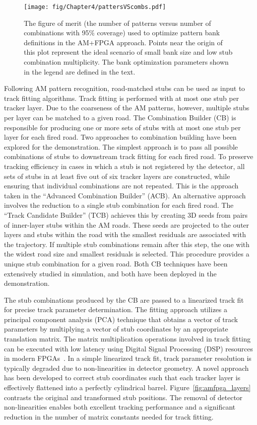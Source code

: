 \begin{figure}[t]
  \centering
  \texttt{[image: fig/Chapter4/pattersVScombs.pdf]}
  \caption{The figure of merit (the number of patterns versus number of combinations with 95\% coverage) used to optimize pattern bank definitions in the AM+FPGA approach. Points near the origin of this plot represent the ideal scenario of small bank size and low stub combination multiplicity. The bank optimization parameters shown in the legend are defined in the text.} 
  \label{fig:amfpga_bankopt}
\end{figure}

Following AM pattern recognition, road-matched stubs can be used as input to track fitting algorithms. Track fitting is performed with at most one stub per tracker layer. Due to the coarseness of the AM patterns, however, multiple stubs per layer can be matched to a given road. The Combination Builder (CB) is responsible for producing one or more sets of stubs with at most one stub per layer for each fired road. Two approaches to combination building have been explored for the demonstration. The simplest approach is to pass all possible combinations of stubs to downstream track fitting for each fired road. To preserve tracking efficiency in cases in which a stub is not registered by the detector, all sets of stubs in at least five out of six tracker layers are constructed, while ensuring that individual combinations are not repeated. This is the approach taken in the ``Advanced Combination Builder'' (ACB). An alternative approach involves the reduction to a single stub combination for each fired road. The ``Track Candidate Builder'' (TCB) achieves this by creating 3D seeds from pairs of inner-layer stubs within the AM roads. These seeds are projected to the outer layers and stubs within the road with the smallest residuals are associated with the trajectory. If multiple stub combinations remain after this step, the one with the widest road size and smallest residuals is selected. This procedure provides a unique stub combination for a given road. Both CB techniques have been extensively studied in simulation, and both have been deployed in the demonstration.

The stub combinations produced by the CB are passed to a linearized track fit for precise track parameter determination. The fitting approach utilizes a principal component analysis (PCA) technique that obtains a vector of track parameters by multiplying a vector of stub coordinates by an appropriate translation matrix. The matrix multiplication operations involved in track fitting can be executed with low latency using Digital Signal Processing (DSP) resources in modern FPGAs~\cite{SVT,FTK}. In a simple linearized track fit, track parameter resolution is typically degraded due to non-linearities in detector geometry. A novel approach has been developed to correct stub coordinates such that each tracker layer is effectively flattened into a perfectly cylindrical barrel. Figure~\ref{fig:amfpga_layers} contrasts the original and transformed stub positions. The removal of detector non-linearities enables both excellent tracking performance and a significant reduction in the number of matrix constants needed for track fitting.

